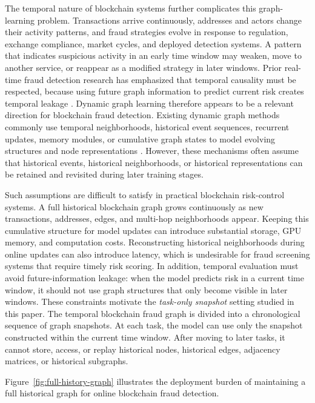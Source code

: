 The temporal nature of blockchain systems further complicates this graph-learning problem. Transactions arrive continuously, addresses and actors change their activity patterns, and fraud strategies evolve in response to regulation, exchange compliance, market cycles, and deployed detection systems. A pattern that indicates suspicious activity in an early time window may weaken, move to another service, or reappear as a modified strategy in later windows. Prior real-time fraud detection research has emphasized that temporal causality must be respected, because using future graph information to predict current risk creates temporal leakage \cite{lu2022bright}. Dynamic graph learning therefore appears to be a relevant direction for blockchain fraud detection. Existing dynamic graph methods commonly use temporal neighborhoods, historical event sequences, recurrent updates, memory modules, or cumulative graph states to model evolving structures and node representations \cite{zheng2024dynamicgnnsurvey}. However, these mechanisms often assume that historical events, historical neighborhoods, or historical representations can be retained and revisited during later training stages.

Such assumptions are difficult to satisfy in practical blockchain risk-control systems. A full historical blockchain graph grows continuously as new transactions, addresses, edges, and multi-hop neighborhoods appear. Keeping this cumulative structure for model updates can introduce substantial storage, GPU memory, and computation costs. Reconstructing historical neighborhoods during online updates can also introduce latency, which is undesirable for fraud screening systems that require timely risk scoring. In addition, temporal evaluation must avoid future-information leakage: when the model predicts risk in a current time window, it should not use graph structures that only become visible in later windows. These constraints motivate the \emph{task-only snapshot} setting studied in this paper. The temporal blockchain fraud graph is divided into a chronological sequence of graph snapshots. At each task, the model can use only the snapshot constructed within the current time window. After moving to later tasks, it cannot store, access, or replay historical nodes, historical edges, adjacency matrices, or historical subgraphs.

Figure~\ref{fig:full-history-graph} illustrates the deployment burden of maintaining a full historical graph for online blockchain fraud detection.

